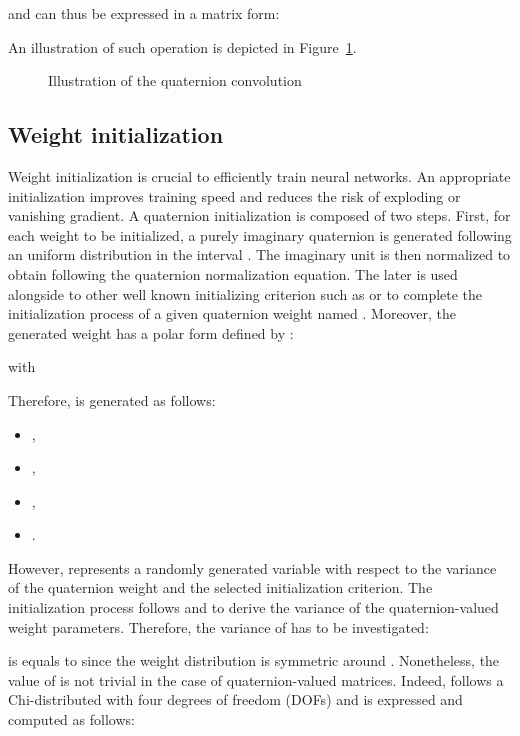 \documentclass[a4paper]{article}
\begin{document}
and can thus be expressed in a matrix form:


An illustration of such operation is depicted in Figure~\ref{fig:qconv}.
\begin{figure}[h!]
 \begin{center}
\caption{Illustration of the quaternion convolution}\label{fig:qconv}
\end{center}
\end{figure}

\subsection{Weight initialization}
\label{subsec:init}
Weight initialization is crucial to efficiently train neural networks. An appropriate initialization improves training speed and reduces the risk of exploding or vanishing gradient. A quaternion initialization is composed of two steps. First, for each weight to be initialized, a purely imaginary quaternion  is generated following an uniform distribution in the interval . The imaginary unit is then normalized to obtain  following the quaternion normalization equation. The later is used alongside to other well known initializing criterion such as \cite{glorot2010understanding} or \cite{he2015delving} to complete the initialization process of a given quaternion weight named . Moreover, the generated weight has a polar form defined by : 

 with
 
 Therefore,  is generated as follows:
\begin{itemize}
	\item ,
	\item ,
	\item ,
	\item .
\end{itemize}
However,  represents a randomly generated variable with respect to the variance of the quaternion weight and the selected initialization criterion. The initialization process follows \cite{glorot2010understanding} and \cite{he2015delving} to derive the variance of the quaternion-valued weight parameters. Therefore, the variance of  has to be investigated:

 is equals to  since the weight distribution is symmetric around . Nonetheless, the value of  is not trivial in the case of quaternion-valued matrices. Indeed,  follows a Chi-distributed with four degrees of freedom (DOFs) and  is expressed and computed as follows:
\end{document}
